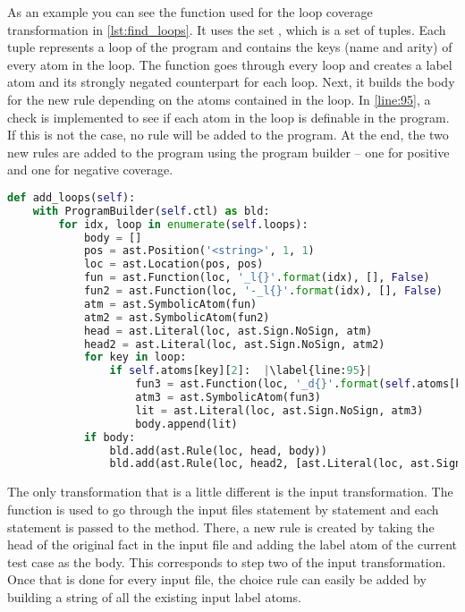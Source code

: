 As an example you can see the function used for the loop coverage transformation in \cref{lst:find_loops}. It uses the set , which is a set of tuples. Each tuple represents a loop of the program and contains the keys (name and arity) of every atom in the loop. The function goes through every loop and creates a label atom and its strongly negated counterpart for each loop. Next, it builds the body for the new rule depending on the atoms contained in the loop. In \cref{line:95}, a check is implemented to see if each atom in the loop is definable in the program. If this is not the case, no rule will be added to the program. At the end, the two new rules are added to the program using the program builder -- one for positive and one for negative coverage.

\begin{lstlisting}[float, caption={Function implementing the loop coverage transformation (taken from CoverageCheck\_final\_final.py)},label=lst:find_loops, language=Python, firstnumber=82, escapechar=|]
def add_loops(self):
    with ProgramBuilder(self.ctl) as bld:
        for idx, loop in enumerate(self.loops):
            body = []
            pos = ast.Position('<string>', 1, 1)
            loc = ast.Location(pos, pos)
            fun = ast.Function(loc, '_l{}'.format(idx), [], False)
            fun2 = ast.Function(loc, '-_l{}'.format(idx), [], False)
            atm = ast.SymbolicAtom(fun)
            atm2 = ast.SymbolicAtom(fun2)
            head = ast.Literal(loc, ast.Sign.NoSign, atm)
            head2 = ast.Literal(loc, ast.Sign.NoSign, atm2)
            for key in loop:
                if self.atoms[key][2]:  |\label{line:95}|
                    fun3 = ast.Function(loc, '_d{}'.format(self.atoms[key][0][0]), [], False)
                    atm3 = ast.SymbolicAtom(fun3)
                    lit = ast.Literal(loc, ast.Sign.NoSign, atm3)
                    body.append(lit)
            if body:
                bld.add(ast.Rule(loc, head, body))
                bld.add(ast.Rule(loc, head2, [ast.Literal(loc, ast.Sign.Negation, atm)]))
\end{lstlisting}

The only transformation that is a little different is the input transformation. The  function is used to go through the input files statement by statement and each statement is passed to the  method. There, a new rule is created by taking the head of the original fact in the input file and adding the label atom of the current test case as the body. This corresponds to step two of the input transformation. Once that is done for every input file, the choice rule can easily be added by building a string of all the existing input label atoms.

